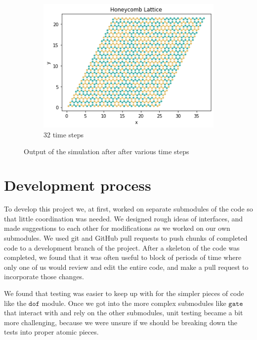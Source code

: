 \documentclass{article}
\begin{document}
\begin{figure}
\begin{subfigure}[b]{0.3\textwidth}
         \includegraphics[width=\textwidth]{step32.png}
         \caption{32 time steps}
         \label{fig:s32}
     \end{subfigure}
        \caption{Output of the simulation after after various time steps}
        \label{fig:output}
\end{figure}

\section{Development process}
To develop this project we, at first, worked on separate submodules of the code so that little coordination was needed. We designed rough ideas of interfaces, and made suggestions to each other for modifications as we worked on our own submodules. We used git and GitHub pull requests to push chunks of completed code to a development branch of the project. After a skeleton of the code was completed, we found that it was often useful to block of periods of time where only one of us would review and edit the entire code, and make a pull request to incorporate those changes.

We found that testing was easier to keep up with for the simpler pieces of code like the $\texttt{dof}$ module. Once we got into the more complex submodules like $\texttt{gate}$ that interact with and rely on the other submodules, unit testing became a bit more challenging, because we were unsure if we should be breaking down the tests into proper atomic pieces.
\end{document}
